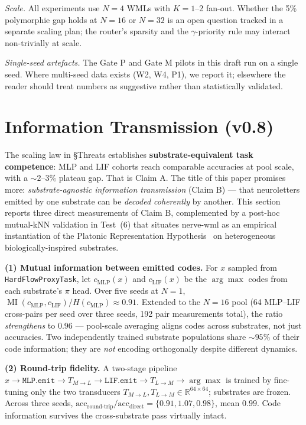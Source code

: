 \documentclass[10pt,twocolumn]{article}
\begin{document}
\textit{Scale.} All experiments use $N=4$ WMLs with $K=1$--2 fan-out. Whether the 5\% polymorphie gap holds at $N=16$ or $N=32$ is an open question tracked in a separate scaling plan; the router's sparsity and the $\gamma$-priority rule may interact non-trivially at scale.

\textit{Single-seed artefacts.} The Gate P and Gate M pilots in this draft run on a single seed. Where multi-seed data exists (W2, W4, P1), we report it; elsewhere the reader should treat numbers as suggestive rather than statistically validated.

\section{Information Transmission (v0.8)}
\label{sec:info-tx}

The scaling law in \S Threats establishes \textbf{substrate-equivalent task competence}: MLP and LIF cohorts reach comparable accuracies at pool scale, with a $\sim 2\text{--}3\%$ plateau gap. That is Claim A. The title of this paper promises more: \emph{substrate-agnostic information transmission} (Claim B) --- that neuroletters emitted by one substrate can be \emph{decoded coherently} by another. This section reports three direct measurements of Claim B, complemented by a post-hoc mutual-kNN validation in Test~(6) that situates nerve-wml as an empirical instantiation of the Platonic Representation Hypothesis~\cite{huh2024platonic} on heterogeneous biologically-inspired substrates.

\textbf{(1) Mutual information between emitted codes.} For $x$ sampled from \texttt{HardFlowProxyTask}, let $c_{\text{MLP}}(x)$ and $c_{\text{LIF}}(x)$ be the $\arg\max$ codes from each substrate's $\pi$ head. Over five seeds at $N=1$, $\operatorname{MI}(c_{\text{MLP}}, c_{\text{LIF}}) / H(c_{\text{MLP}}) \approx 0.91$. Extended to the $N=16$ pool (64 MLP--LIF cross-pairs per seed over three seeds, 192 pair measurements total), the ratio \emph{strengthens} to $0.96$ --- pool-scale averaging aligns codes across substrates, not just accuracies. Two independently trained substrate populations share $\sim 95\%$ of their code information; they are \emph{not} encoding orthogonally despite different dynamics.

\textbf{(2) Round-trip fidelity.} A two-stage pipeline
$x \to \texttt{MLP.emit} \to T_{M \to L} \to \texttt{LIF.emit} \to T_{L \to M} \to \arg\max$
is trained by fine-tuning only the two transducers $T_{M \to L}, T_{L \to M} \in \mathbb{R}^{64 \times 64}$; substrates are frozen. Across three seeds, $\text{acc}_{\text{round-trip}} / \text{acc}_{\text{direct}} = \{0.91, 1.07, 0.98\}$, mean $0.99$. Code information survives the cross-substrate pass virtually intact.
\end{document}
